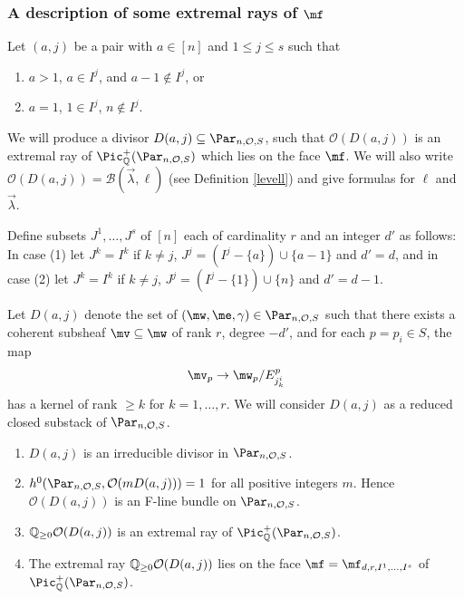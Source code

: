 \subsubsection{A description of some extremal rays of $\mf$}\label{basicR}
Let $(a,j)$ be a pair with $a\in[n]$ and $1\leq j\leq s$ such that
\begin{enumerate}
\item $a>1$, $a\in I^j$, and $a-1\not\in I^j$, or
\item $a=1$, $1\in I^j$, $n\not\in I^j$.
\end{enumerate}
We will produce a divisor $D(a,j)\subseteq \Par_{n,\mathcal{O},S}$, such that $\mathcal{O}(D(a,j))$ is an extremal ray of $\Pic^+_{\Bbb{Q}}(\Par_{n,\mathcal{O},S})$
which lies on the face $\mf$. We will also write $\mathcal{O}(D(a,j))=\mathcal{B}(\vec{\lambda},\ell)$ (see Definition \ref{levell}) and give formulas for $\ell$ and $\vec{\lambda}$.
\begin{defi}
\notready
Define subsets $J^1,\dots,J^s$ of $[n]$ each of cardinality $r$ and an integer $d'$ as follows:
In case (1) let $J^k=I^k$ if $k\neq j$, $J^j=(I^j-\{a\}) \cup \{a-1\}$ and $d'=d$, and in case (2) let  $J^k=I^k$ if $k\neq j$, $J^j=(I^j-\{1\}) \cup \{n\}$ and $d'=d-1$.

Let $D(a,j)$ denote the set  of $(\mw,\me,\gamma)\in \Par_{n,\mathcal{O},S}$ such that there exists a
coherent subsheaf $\mv\subseteq \mw$ of  rank $r$,  degree $-d'$, and for each $p=p_i\in S$, the map
 $$\mv_p\to \mw_p/E^p_{j^i_k}$$ has a kernel of rank $\geq k$ for $k=1,\dots,r$. We will consider $D(a,j)$ as a reduced closed substack of $\Par_{n,\mathcal{O},S}$.
\end{defi}
\begin{theorem}
\notready\label{Adagio}

\begin{enumerate}
\item  $D(a,j)$ is an irreducible divisor in  $\Par_{n,\mathcal{O},S}$.
\item $h^0(\Par_{n,\mathcal{O},S}, \mathcal{O}(mD(a,j)))=1$ for all positive integers $m$. Hence  $\mathcal{O}(D(a,j))$ is an F-line bundle on $\Par_{n,\mathcal{O},S}$.
\item $\Bbb{Q}_{\geq 0}\mathcal{O}(D(a,j))$  is an extremal ray of $\Pic^+_{\Bbb{Q}}(\Par_{n,\mathcal{O},S})$.
\item The extremal ray $\Bbb{Q}_{\geq 0}\mathcal{O}(D(a,j))$ lies on the face  $\mf=\mf_{d,r,I^1,\dots,I^s}$ of $\Pic^+_{\Bbb{Q}}(\Par_{n,\mathcal{O},S})$.
\end{enumerate}
\end{theorem}

